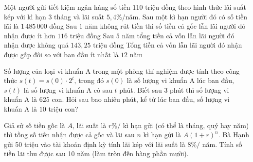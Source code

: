 \begin{ex}%
	 Một người gửi tiết kiệm ngân hàng số tiền $110$ triệu đồng theo hình thức lãi suất kép với kì hạn $3$ tháng và lãi suất $5{,}4\%$/năm.
	 \choiceTF
		 {\True Sau một kì hạn người đó có số tiền lãi là $1\,485\,000$ đồng}
		{Sau $1$ năm không rút tiền thì  số tiền cả gốc lẫn lãi người đó nhận được ít hơn $116$ triệu đồng}
		{Sau $5$ năm tổng tiền cả vốn  lẫn lãi người đó nhận được không quá $143{,}25$ triệu đồng}
		{Tổng tiền cả vốn lẫn lãi người đó nhận được gấp đôi so với  ban đầu ít nhất là $12$ năm}
\end{ex}



\begin{ex}%
	Số lượng của loại vi khuẩn A trong một phòng thí nghiệm được tính theo công thức $s(t)=s(0) \cdot 2^t$, trong đó $s(0)$ là số lượng vi khuẩn A lúc ban đầu, $s(t)$ là số lượng vi khuẩn A có sau $t$ phút. Biết sau $3$ phút thì số lượng vi khuẩn A là  $625$ con. Hỏi sau bao nhiêu phút, kể từ lúc ban đầu, số lượng vi khuẩn A là $10$ triệu con?
\end{ex}

\begin{ex}%
	Giả sử số tiền gốc là $ A$, lãi suất là $ r\% /$ kì hạn gửi (có thể là tháng, quý hay năm) thì tồng số tiền nhận được cả gốc và lãi sau $ n$ kì hạn gửi là $ A{(1+r)^n}$. Bà Hạnh gửi 50 triệu vào tài khoản định kỳ tính  lãi kép với lãi suất là $ 8\% /$ năm. Tính số tiền lãi thu được sau 10 năm (làm tròn đến hàng phần mười).
\end{ex}

